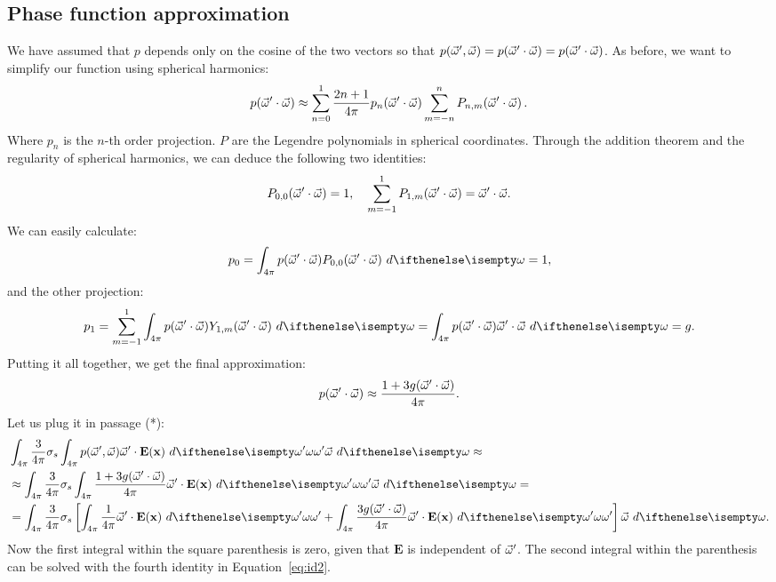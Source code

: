 \documentclass[10pt,a4paper]{article}
\begin{document}
\subsection{Phase function approximation}
\label{sec:furtherderiv}
We have assumed   that $p$ depends only on the cosine of the two vectors so that $p(\vec{\omega}', \vec{\omega}) = p(\vec{\omega}' \cdot \vec{\omega}) = p(\vec{\omega}' \cdot \vec{\omega})$. As before, we want to simplify our function using spherical harmonics:
$$
p(\vec{\omega}' \cdot \vec{\omega}) \approx \sum_{n = 0}^{1} \frac{2n+1}{4\pi} p_{n}( \vec{\omega}' \cdot \vec{\omega}) \sum_{m = -n}^{n}  P_{n,m}(\vec{\omega}' \cdot \vec{\omega}) \,.
$$
Where $p_n$ is the $n$-th order projection. $P$ are the Legendre polynomials in spherical coordinates. Through the addition theorem and the regularity of spherical harmonics, we can deduce the following two identities:
$$
P_{0,0}(\omegavec' \cdot \omegavec) = 1, \ \ \ \sum_{m = -1}^{1}  P_{1,m}(\omegavec' \cdot \omegavec) = \omegavec' \cdot \omegavec.
$$
 We can easily calculate:
$$
p_0 = \sphere{p(\omegavec' \cdot \omegavec) P_{0,0}(\omegavec' \cdot \omegavec)}{} = 1,
$$
and the other projection:
$$
p_1 = \sum_{m = -1}^{1} \sphere{p(\omegavec' \cdot \omegavec) Y_{1,m}(\omegavec' \cdot \omegavec)}{} = \sphere{p(\omegavec' \cdot \omegavec) \omegavec' \cdot \omegavec}{} =  g.
$$
Putting it all together, we get the final approximation:
$$
p(\vec{\omega}' \cdot \vec{\omega}) \approx \frac{1 + 3g (\vec{\omega}' \cdot \vec{\omega})}{4\pi} 
.$$
Let us plug it in passage (*):
\begin{equation*}
\begin{split}
&\sphere{ \frac{3}{4\pi} \scattering  \sphere {p(\omegavec', \omegavec)  \omegavec' \cdot \xvecfunc{E}}{\omega'} \omegavec}{} \approx  \\
&\approx \sphere{ \frac{3}{4\pi} \scattering  \sphere { \frac{1 + 3g (\omegavec' \cdot \omegavec)}{4\pi}  \omegavec' \cdot \xvecfunc{E}}{\omega'} \omegavec}{} = \\
&= \sphere{ \frac{3}{4\pi} \scattering  \left[ \sphere { \frac{1}{4\pi}  \omegavec' \cdot \xvecfunc{E}}{\omega'} + \sphere { \frac{3g (\omegavec' \cdot \omegavec)}{4\pi}  \omegavec' \cdot \xvecfunc{E}}{\omega'} \right] \omegavec}{} .
\end{split}
\end{equation*}
Now the first integral within the square parenthesis is zero, given that $\mathbf{E}$ is independent of $\vec{\omega}'$. The second integral within the parenthesis can be solved with the fourth identity in Equation~\ref{eq:id2}.
\end{document}
